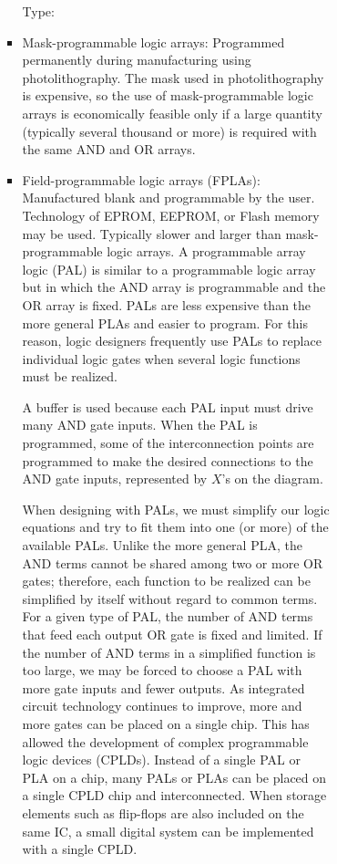 \documentclass[a4paper,12pt]{article}
\begin{document}
\begin{itemize}
\begin{itemize}
\begin{itemize}
\begin{itemize}
\begin{itemize}
\begin{itemize}
\begin{itemize}
Type:
\bit
\item Mask-programmable logic arrays: Programmed permanently during manufacturing using photolithography. The mask used in photolithography is expensive, so the use of mask-programmable logic arrays is economically feasible only if a large quantity (typically several thousand or more) is required with the same AND and OR arrays.
\item Field-programmable logic arrays (FPLAs): Manufactured blank and programmable by the user. Technology of EPROM, EEPROM, or Flash memory may be used. Typically slower and larger than mask-programmable logic arrays.
\eit
{}
A programmable array logic (PAL) is similar to a programmable logic array but in which the AND array is programmable and the OR array is fixed. PALs are less expensive than the more general PLAs and easier to program. For this reason, logic designers frequently use PALs to replace individual logic gates when several logic functions must be realized.

A buffer is used because each PAL input must drive many AND gate inputs. When the PAL is programmed, some of the interconnection points are programmed to make the desired connections to the AND gate inputs, represented by $X$'s on the diagram.

When designing with PALs, we must simplify our logic equations and try to fit them into one (or more) of the available PALs. Unlike the more general PLA, the AND terms cannot be shared among two or more OR gates; therefore, each function to be realized can be simplified by itself without regard to common terms. For a given type of PAL, the number of AND terms that feed each output OR gate is fixed and limited. If the number of AND terms in a simplified function is too large, we may be forced to choose a PAL with more gate inputs and fewer outputs.
As integrated circuit technology continues to improve, more and more gates can be placed on a single chip. This has allowed the development of complex programmable logic devices (CPLDs). Instead of a single PAL or PLA on a chip, many PALs or PLAs can be placed on a single CPLD chip and interconnected. When storage elements such as flip-flops are also included on the same IC, a small digital system can be implemented with a single CPLD.


\end{itemize}
\end{itemize}
\end{itemize}
\end{itemize}
\end{itemize}
\end{itemize}
\end{itemize}
\end{document}
